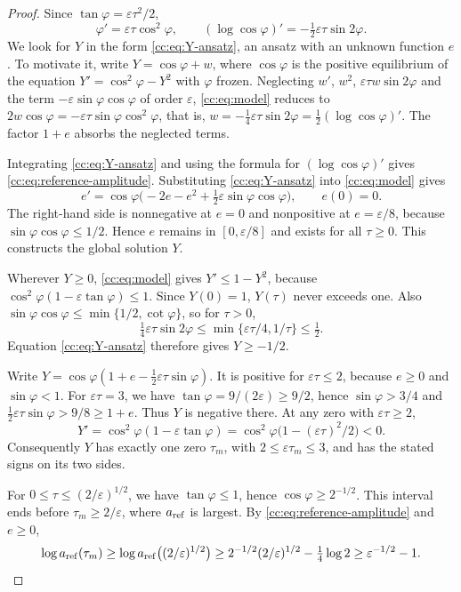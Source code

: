 \begin{proof}
Since $\tan\varphi=\varepsilon\tau^2/2$,
\[
 \varphi'=\varepsilon\tau\cos^2\varphi,\qquad
 (\log\cos\varphi)'=-\tfrac12\varepsilon\tau\sin2\varphi.
\]
We look for $Y$ in the form \eqref{cc:eq:Y-ansatz}, an ansatz with an
unknown function $e$. To motivate it, write $Y=\cos\varphi+w$, where
$\cos\varphi$ is the positive equilibrium of the equation
$Y'=\cos^2\varphi-Y^2$ with $\varphi$ frozen. Neglecting $w'$, $w^2$,
$\varepsilon\tau w\sin2\varphi$ and the term
$-\varepsilon\sin\varphi\cos\varphi$ of order $\varepsilon$,
\eqref{cc:eq:model} reduces to
$2w\cos\varphi=-\varepsilon\tau\sin\varphi\cos^2\varphi$, that is,
$w=-\tfrac14\varepsilon\tau\sin2\varphi=\tfrac12(\log\cos\varphi)'$.
The factor $1+e$ absorbs the neglected terms.

Integrating \eqref{cc:eq:Y-ansatz} and using the formula for
$(\log\cos\varphi)'$ gives \eqref{cc:eq:reference-amplitude}.
Substituting \eqref{cc:eq:Y-ansatz} into \eqref{cc:eq:model} gives
\[
 e'=\cos\varphi\bigl(-2e-e^2
                 +\tfrac12\varepsilon\sin\varphi\cos\varphi\bigr),
 \qquad e(0)=0.
\]
The right-hand side is nonnegative at $e=0$ and nonpositive at
$e=\varepsilon/8$, because $\sin\varphi\cos\varphi\le1/2$. Hence
$e$ remains in $[0,\varepsilon/8]$ and exists for all $\tau\ge0$.
This constructs the global solution $Y$.

Wherever $Y\ge0$, \eqref{cc:eq:model} gives $Y'\le1-Y^2$, because
$\cos^2\varphi(1-\varepsilon\tan\varphi)\le1$. Since $Y(0)=1$,
$Y(\tau)$ never exceeds one. Also
$\sin\varphi\cos\varphi\le\min\{1/2,\cot\varphi\}$, so for $\tau>0$,
\[
 \tfrac14\varepsilon\tau\sin2\varphi
 \le\min\{\varepsilon\tau/4,1/\tau\}\le\tfrac12.
\]
Equation \eqref{cc:eq:Y-ansatz} therefore gives $Y\ge-1/2$.

Write $Y=\cos\varphi(1+e-\tfrac12\varepsilon\tau\sin\varphi)$.
It is positive for $\varepsilon\tau\le2$, because $e\ge0$ and
$\sin\varphi<1$. For $\varepsilon\tau=3$, we have
$\tan\varphi=9/(2\varepsilon)\ge9/2$, hence $\sin\varphi>3/4$ and
$\tfrac12\varepsilon\tau\sin\varphi>9/8\ge1+e$. Thus $Y$ is negative
there. At any zero with $\varepsilon\tau\ge2$,
\[
 Y'=\cos^2\varphi(1-\varepsilon\tan\varphi)
    =\cos^2\varphi\bigl(1-(\varepsilon\tau)^2/2\bigr)<0.
\]
Consequently $Y$ has exactly one zero $\tau_m$, with
$2\le\varepsilon\tau_m\le3$, and has the stated signs on its two sides.

For $0\le\tau\le(2/\varepsilon)^{1/2}$, we have $\tan\varphi\le1$,
hence $\cos\varphi\ge2^{-1/2}$. This interval ends before
$\tau_m\ge2/\varepsilon$, where $a_{\rm ref}$ is largest. By
\eqref{cc:eq:reference-amplitude} and $e\ge0$,
\[
 \log a_{\rm ref}(\tau_m)
 \ge\log a_{\rm ref}\bigl((2/\varepsilon)^{1/2}\bigr)
 \ge2^{-1/2}(2/\varepsilon)^{1/2}-\tfrac14\log2
 \ge\varepsilon^{-1/2}-1.
 \qedhere
\]
\end{proof}

